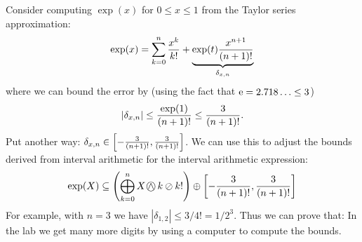 \begin{example} Consider computing $\exp(x)$ for $0 \ensuremath{\leq} x \ensuremath{\leq} 1$ from the Taylor series approximation:
\[
\exp(x) = \sum_{k=0}^n {x^k \over k!} + \underbrace{\exp(t){x^{n+1} \over (n+1)!}}_{\ensuremath{\delta}_{x,n}}
\]
where we can bound the error by (using the fact that ${\rm e} = 2.718\ldots \leq 3$)
\[
|\ensuremath{\delta}_{x,n}| \ensuremath{\leq} {\exp(1) \over (n+1)!} \ensuremath{\leq} {3 \over (n+1)!}.
\]
Put another way: $\ensuremath{\delta}_{x,n} \ensuremath{\in} \left[-{3 \over (n+1)!}, {3 \over (n+1)!}\right]$. We can use this to adjust the bounds derived from interval arithmetic for the interval arithmetic expression:
\[
\exp(X) \subseteq \left(\bigoplus_{k=0}^n {X \wedge\mkern-19mu \bigcirc\, k \oslash k!}\right) \oplus \left[-{3 \over (n+1)!}, {3 \over (n+1)!}\right]
\]
For example, with $n = 3$ we have $|\ensuremath{\delta}_{1,2}| \ensuremath{\leq} 3/4! = 1/2^3$. Thus we can prove that:
In the lab we get many more digits by using a computer to compute the bounds. \end{example}



